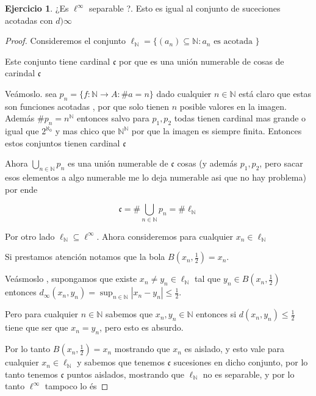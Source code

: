 \documentclass[12pt]{report}
\newcommand{\n}{\aleph_{0}}
\newcommand{\N}{\mathbb{N}}
\newcommand{\ra}{\rightarrow}
\theoremstyle{definition}
\newtheorem{ej}{Ejercicio}
\begin{document}
\begin{ej}
	¿Es $\ell^{\infty}$ separable ?. Esto es igual al conjunto de suceciones acotadas con $d){\infty}$
	\begin{proof}
		Consideremos el conjunto $\ell_{\N} = \{(a_n)\subseteq \N : a_n \text{ es acotada }\}$

		Este conjunto tiene cardinal $\mathfrak{c}$ por que es una unión numerable de cosas de carindal $\mathfrak{c}$

		Veámoslo. sea $p_n= \{f: \N \ra A : \# a =n  \}$ dado cualquier $n \in \N$ está claro que estas son funciones acotadas , por que solo tienen $n$ posible valores en la imagen. Además $\# p_n = n^\N$ entonces salvo para $p_1,p_2$ todas tienen cardinal mas grande o igual que $2^{\n}$ y mas chico que $\N ^\N$ por que la imagen es siempre finita. Entonces estos conjuntos tienen cardinal $\mathfrak{c}$

		Ahora $\bigcup_{n\in\N} p_n $ es una unión numerable de $\mathfrak{c}$ cosas (y además $p_1,p_2$, pero sacar esos elementos a algo numerable me lo deja numerable asi que no hay problema) por ende 

		$$\mathfrak{c} = \# \bigcup_{n\in\N} p_n = \# \ell_{\N} $$

		Por otro lado $\ell_{\N} \subseteq \ell^{\infty}$. Ahora consideremos para cualquier $x_n \in \ell_{\N}$ 

		Si prestamos atención notamos que la bola $B(x_n,\frac{1}{2}) = x_n$. 

		Veásmoslo , supongamos que existe $x_n \neq y_n \in \ell_{\N}$ tal que $y_n \in B(x_n,\frac{1}{2})$ entonces $d_{\infty}(x_n,y_n) = \sup_{n \in \N} |x_n - y_n| \leq \frac{1}{2}$.

		Pero para cualquier $n \in \N$ sabemos que $x_n,y_n \in \N$ entonces si $d(x_n,y_n) \leq \frac{1}{2}$ tiene que ser que $x_n = y_n $, pero esto es absurdo. 

		Por lo tanto $B(x_n,\frac{1}{2}) = x_n$ mostrando que $x_n$ es aislado, y esto vale para cualquier $x_n \in \ell_{\N}$ y sabemos que tenemos $\mathfrak{c}$ sucesiones en dicho conjunto, por lo tanto tenemos $\mathfrak{c}$ puntos aislados, mostrando que $\ell_{\N}$ no es separable, y por lo tanto $\ell^{\infty}$ tampoco lo és
	\end{proof}
	
	
\end{ej}
\end{document}
